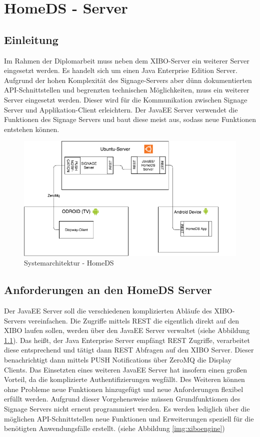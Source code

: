 \chapter{HomeDS - Server}
\section{Einleitung}\label{sec:einleitung}
Im Rahmen der Diplomarbeit muss neben dem XIBO-Server ein weiterer Server eingesetzt werden. Es handelt sich um einen Java Enterprise Edition Server. Aufgrund der hohen Komplexität des Signage-Servers aber dünn dokumentierten API-Schnittstellen und begrenzten technischen Möglichkeiten, muss ein weiterer Server eingesetzt werden. Dieser wird für die Kommunikation zwischen Signage Server und Applikation-Client erleichtern. Der JavaEE Server verwendet die Funktionen des Signage Servers und baut diese meist aus, sodass neue Funktionen entstehen können.

\begin{figure}[H]
\centering
\includegraphics[width=1\textwidth]{images/08_HomeDsWeb/SystemArch.png}
\caption{Systemarchitektur - HomeDS}
\label{img:systemarchitektur}
\end{figure}
 
\section{Anforderungen an den HomeDS Server}\label{sec:homeds}
Der JavaEE Server soll die verschiedenen komplizierten Abläufe des XIBO-Servers vereinfachen. Die Zugriffe mittels REST die eigentlich direkt auf den XIBO laufen sollen, werden über den JavaEE Server verwaltet (siehe Abbildung \ref{img:systemarchitektur}). Das heißt, der Java Enterprise Server empfängt REST Zugriffe, verarbeitet diese entsprechend und tätigt dann REST Abfragen auf den XIBO Server. Dieser benachrichtigt dann mittels PUSH Notifications über ZeroMQ die Display Clients. Das Einsetzten eines weiteren JavaEE Server hat insofern einen großen Vorteil, da die komplizierte Authentifizierungen wegfällt. Des Weiteren können ohne Probleme neue Funktionen hinzugefügt und neue Anforderungen flexibel erfüllt werden. Aufgrund dieser Vorgehensweise müssen Grundfunktionen des Signage Servers nicht erneut programmiert werden. Es werden lediglich über die möglichen API-Schnittstellen neue Funktionen und Erweiterungen speziell für die benötigten Anwendungsfälle erstellt. (siehe Abbildung \ref{img:xiboengine})


